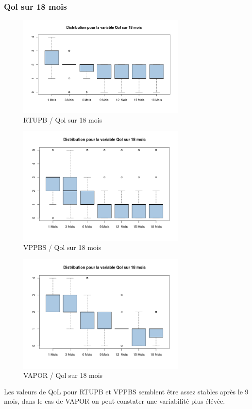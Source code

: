%
%


\subsubsection{Qol sur 18 mois }

\begin{figure}[H]
\centering
\includegraphics[width=0.75\textwidth]{../Fig/RTUPB/rtupb-boxplot-post-Qol}
\caption{RTUPB / Qol sur 18 mois}
\end{figure}	
	
\begin{figure}[H]
\centering
\includegraphics[width=0.75\textwidth]{../Fig/VPPBS/vppbs-boxplot-post-Qol}
\caption{VPPBS / Qol sur 18 mois}
\end{figure}	
	
	
\begin{figure}[H]
\centering
\includegraphics[width=0.75\textwidth]{../Fig/VAPOR/vapor-boxplot-post-Qol}
\caption{VAPOR / Qol sur 18 mois}
\end{figure}	
	

%

Les valeurs de QoL pour RTUPB et VPPBS semblent être assez stables après le 9 mois, 
dans le cas de VAPOR on peut constater une variabilité plus élévée.  	
